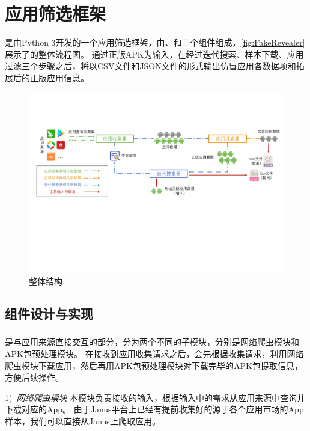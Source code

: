 \chapter{应用筛选框架\mytool}
\label{chp:fakerevealer}

\mytool 是由Python 3开发的一个应用筛选框架，由\componentA 、\componentB 和\componentC 三个组件组成，\autoref{fig:FakeRevealer}展示了\mytool 的整体流程图。
通过正版APK为输入，\mytool 在经过迭代搜索、样本下载、应用过滤三个步骤之后，将以CSV文件和JSON文件的形式输出仿冒应用各数据项和拓展后的正版应用信息。

\begin{figure}[htbp]
	\centering
	\includegraphics[width=\textwidth]{./Figures/edwin-fakerevealer}
	\caption{\mytool 整体结构}
	\label{fig:FakeRevealer}
	\vspace{-3mm}
\end{figure}


\section{组件设计与实现}


\subsection{\componentA }
\componentA 是与应用来源直接交互的部分，分为两个不同的子模块，分别是网络爬虫模块和APK包预处理模块。
在接收到应用收集请求之后，\componentA 会先根据收集请求，利用网络爬虫模块下载应用，然后再用APK包预处理模块对下载完毕的APK包提取信息，方便后续操作。

1)\ \emph{网络爬虫模块} \quad
本模块负责接收\componentA 的输入，根据输入中的需求从应用来源中查询并下载对应的App。
由于Janus平台上已经有提前收集好的源于各个应用市场的App样本，我们可以直接从Janus上爬取应用。

